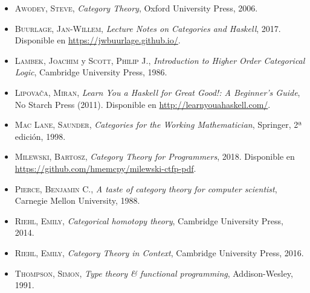 \documentclass[\OPTfontsize, twoside]{book}
\begin{document}
\begin{itemize}
  \setlength\itemsep{1em}
  \item \textsc{Awodey, Steve}, \emph{Category Theory}, Oxford University Press, 2006.
  \item \textsc{Buurlage, Jan-Willem}, \emph{Lecture Notes on Categories and Haskell}, 2017. Disponible en \url{https://jwbuurlage.github.io/}.
  \item \textsc{Lambek, Joachim} y \textsc{Scott, Philip J.}, \emph{Introduction to Higher Order Categorical Logic}, Cambridge University Press, 1986.
  \item \textsc{Lipovača, Miran}, \emph{Learn You a Haskell for Great Good!: A Beginner's Guide}, No Starch Press (2011). Disponible en \url{http://learnyouahaskell.com/}.
  \item \textsc{Mac Lane, Saunder}, \emph{Categories for the Working Mathematician}, Springer, 2ª edición, 1998.
  \item \textsc{Milewski, Bartosz}, \emph{Category Theory for Programmers}, 2018. Disponible en \url{https://github.com/hmemcpy/milewski-ctfp-pdf}.
  \item \textsc{Pierce, Benjamin C.}, \emph{A taste of category theory for computer scientist}, Carnegie Mellon University, 1988.
  \item \textsc{Riehl, Emily}, \emph{Categorical homotopy theory}, Cambridge University Press, 2014.
  \item \textsc{Riehl, Emily}, \emph{Category Theory in Context}, Cambridge University Press, 2016.
  \item \textsc{Thompson, Simon}, \emph{Type theory \& functional programming}, Addison-Wesley, 1991.
\end{itemize}

\printindex
\end{document}
